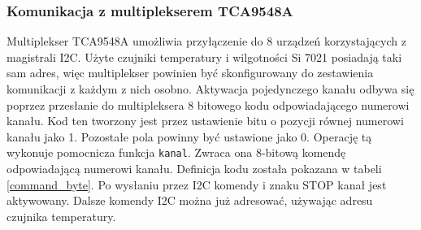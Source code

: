 \documentclass[a4paper,11pt,twoside]{article}
\begin{document}
\subsubsection{Komunikacja z multiplekserem TCA9548A}
Multiplekser TCA9548A umożliwia przyłączenie do 8 urządzeń korzystających z magistrali I2C. Użyte czujniki temperatury i wilgotności Si 7021 posiadają taki sam adres, więc multiplekser powinien być skonfigurowany do zestawienia komunikacji z każdym z nich osobno. Aktywacja pojedynczego kanału odbywa się poprzez przesłanie do multipleksera 8 bitowego kodu odpowiadającego numerowi kanału. Kod ten tworzony jest przez ustawienie bitu o pozycji równej numerowi kanału jako 1. Pozostałe pola powinny być ustawione jako 0. Operację tą wykonuje pomocnicza funkcja \texttt{kanal}. Zwraca ona 8-bitową komendę odpowiadającą numerowi kanału. Definicja kodu została pokazana w tabeli \ref{command_byte}. Po wysłaniu przez I2C komendy i znaku STOP kanał jest aktywowany. Dalsze komendy I2C można już adresować, używając adresu czujnika temperatury.
\end{document}
